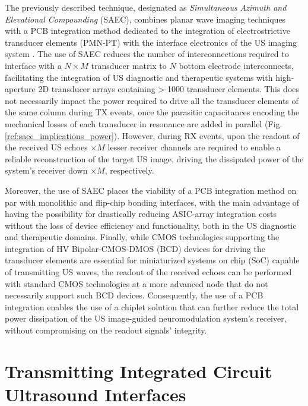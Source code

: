 \par
The previously described technique, designated as \textit{Simultaneous Azimuth and Elevational Compounding} (SAEC), combines planar wave imaging techniques with a PCB integration method dedicated to the integration of electrostrictive transducer elements (PMN-PT) with the interface electronics of the US imaging system \cite{https://ieeexplore.ieee.org/document/9957541}. The use of SAEC reduces the number of interconnections required to interface with a $N\times M$ transducer matrix to $N$ bottom electrode interconnects, facilitating the integration of US diagnostic and therapeutic systems with high-aperture 2D transducer arrays containing > 1000 transducer elements. This does not necessarily impact the power required to drive all the transducer elements of the same column during TX events, once the parasitic capacitances encoding the mechanical losses of each transducer in resonance are added in parallel (Fig. \ref{ref:saec_implications_power}). However,  during RX events, upon the readout of the received US echoes $\times M$ lesser receiver channels are required to enable a reliable reconstruction of the target US image, driving the dissipated power of the system's receiver down  $\times M$, respectively.

Moreover, the use of SAEC places the viability of a PCB integration method on par with monolithic and flip-chip bonding interfaces, with the main advantage of having the possibility for drastically reducing ASIC-array integration costs without the loss of device efficiency and functionality, both in the US diagnostic and therapeutic domains. Finally, while CMOS technologies supporting the integration of HV Bipolar-CMOS-DMOS (BCD) devices for driving the transducer elements are essential for miniaturized systems on chip (SoC) capable of transmitting US waves, the readout of the received echoes can be performed with standard CMOS technologies at a more advanced node that do not necessarily support such BCD devices. Consequently, the use of a PCB integration enables the use of a chiplet solution that can further reduce the total power dissipation of the US image-guided neuromodulation system's receiver, without compromising on the readout signals' integrity.

\section{Transmitting Integrated Circuit Ultrasound Interfaces}
\label{sec:ultrasound_tx_interfaces}

